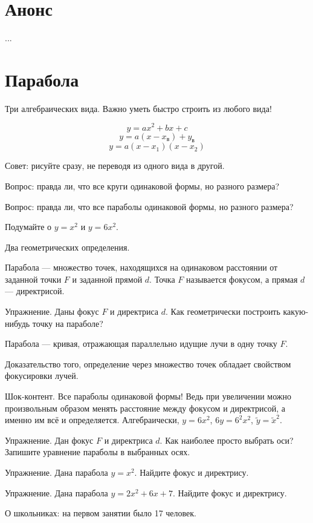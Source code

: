 \documentclass[12pt]{article}
\theoremstyle{definition}
\begin{document}
\tableofcontents{}

\section*{Анонс}
...

\newpage
\setcounter{section}{0}
\section{Парабола}

Три алгебраических вида. Важно уметь быстро строить из любого вида!

\[
y = ax^2 + bx + c  
\]
\[
y = a(x - x_{\text{в}}) + y_{\text{в}}
\]
\[
y = a(x - x_1) (x-x_2)  
\]

Совет: рисуйте сразу, не переводя из одного вида в другой. 

Вопрос: правда ли, что все круги одинаковой формы, но разного размера?

Вопрос: правда ли, что все параболы одинаковой формы, но разного размера?

Подумайте о $y=x^2$ и $y=6x^2$.

Два геометрических определения.

Парабола — множество точек, находящихся на одинаковом расстоянии от заданной точки $F$ 
и заданной прямой $d$. Точка $F$ называется фокусом, а прямая $d$ — директрисой. 

Упражнение. Даны фокус $F$ и директриса $d$. 
Как геометрически построить какую-нибудь точку на параболе?

Парабола — кривая, отражающая параллельно идущие лучи в одну точку $F$. 

Доказательство того, определение через множество точек обладает свойством фокусировки лучей. 

Шок-контент. Все параболы одинаковой формы! 
Ведь при увеличении можно произвольным образом менять расстояние между фокусом и директрисой, а именно им всё и определяется. 
Алгебраически, $y=6x^2$, $6y = 6^2 x^2$, $\tilde y = \tilde x^2$.

Упражнение. Дан фокус $F$ и директриса $d$. Как наиболее просто выбрать оси?
Запишите уравнение параболы в выбранных осях. 

Упражнение. Дана парабола $y=x^2$. Найдите фокус и директрису. 


Упражнение. Дана парабола $y=2x^2 + 6x + 7$. Найдите фокус и директрису. 

О школьниках: на первом занятии было 17 человек. 
\end{document}
